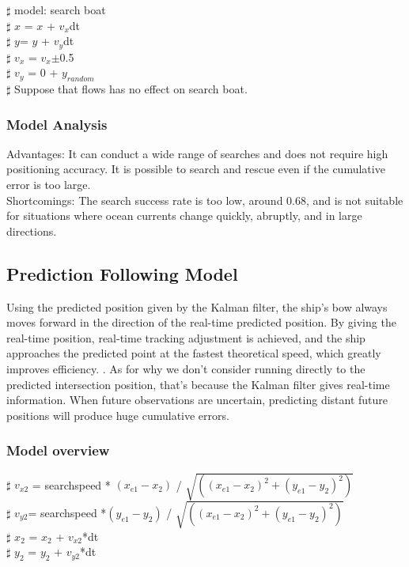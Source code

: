 \documentclass[12pt]{article}  %
\begin{document}
    $\sharp$ model: search boat \\
    $\sharp$ $x$ = $x$ + $v_x$dt\\
    $\sharp$ $y$= $y$ + $v_y$dt\\
    $\sharp$ $v_x$ = $v_x$$\pm$0.5\\
    $\sharp$ $v_y$ = 0 + $y_{random}$\\
    $\sharp$ Suppose that flows has no effect on search boat.\\


    \subsubsection{Model Analysis}
    \indent Advantages: It can conduct a wide range of searches and does not require high positioning accuracy. It is possible to search and rescue even if the cumulative error is too large.\\

    Shortcomings: The search success rate is too low, around 0.68, and is not suitable for situations where ocean currents change quickly, abruptly, and in large directions.

    \subsection{Prediction Following Model}
\indent Using the predicted position given by the Kalman filter, the ship's bow always moves forward in the direction of the real-time predicted position. By giving the real-time position, real-time tracking adjustment is achieved, and the ship approaches the predicted point at the fastest theoretical speed, which greatly improves efficiency. . As for why we don’t consider running directly to the predicted intersection position, that’s because the Kalman filter gives real-time information. When future observations are uncertain, predicting distant future positions will produce huge cumulative errors.

\subsubsection{Model overview}

\indent $\sharp$ $v_{x2}$ = searchspeed * $\left(x_{e1} - x_2\right)$ / $\sqrt{\left( \left(x_{e1} - x_2\right)^{2} + \left(y_{e1} - y_2\right)^{2}\right)}$\\
\indent $\sharp$ $v_{y2}$= searchspeed *$\left(y_{e1} - y_2\right)$ / $\sqrt{\left( \left(x_{e1} - x_2\right)^{2} + \left(y_{e1} - y_2\right)^{2}\right)}$\\
\indent $\sharp$ $x_2$ = $x_2$ + $v_{x2}$*dt\\
\indent $\sharp$ $y_2$ = $y_2$ + $v_{y2}$*dt\\
\end{document}
